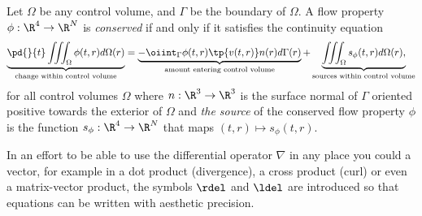 \begin{df}
Let $\Omega$ be any control volume, and $\Gamma$ be the boundary of $\Omega$.
A flow property $\phi:\R^4\to \R^N$ is \emph{conserved} if and only if it satisfies the
continuity equation
    \begin{equation}
        \underbrace{\pd{}{t} \iiint_\Omega \phi(t,r) d\Omega(r)}_{\text{change within control volume}}
        =
        \underbrace{-\oiint_\Gamma \phi(t,r) \tp{v(t,r)} n(r) d\Gamma(r)}_{\text{amount entering control volume}}
        + \underbrace{\iiint_\Omega s_\phi(t,r) d\Omega(r),}_{\text{sources within control volume}}
    \end{equation}
for all control volumes $\Omega$
where $n:\R^3\to \R^3$ is the surface normal of $\Gamma$ oriented positive towards
the exterior of $\Omega$ and
\emph{the source} of the conserved flow property $\phi$ is the function
$s_\phi:\R^4 \to \R^N$ that maps $(t,r)\mapsto s_\phi(t,r)$.
\end{df}

\begin{rk}
In an effort to be able to use the differential operator $\nabla$ in any place you
 could a vector, for example in a dot product (divergence), a cross product (curl)
or even a matrix-vector product, the symbols $\rdel$ and $\ldel$ are introduced
so that equations can be written with aesthetic precision.
\end{rk}

